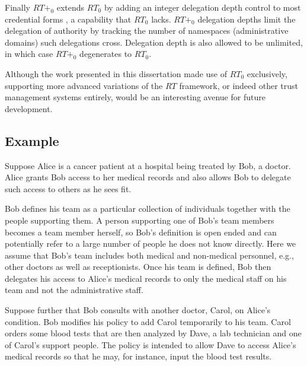 Finally $RT+_0$ extends $RT_0$ by adding an integer delegation depth control to most
credential forms \cite{Hong:DDCTMS}, a capability that $RT_0$ lacks. $RT+_0$ delegation depths
limit the delegation of authority by tracking the number of namespaces (administrative domains)
such delegations cross. Delegation depth is also allowed to be unlimited, in which case $RT+_0$
degenerates to $RT_0$.

Although the work presented in this dissertation made use of $RT_0$ exclusively, supporting more
advanced variations of the $RT$ framework, or indeed other trust management systems entirely,
would be an interesting avenue for future development.

\subsection{Example}

Suppose Alice is a cancer patient at a hospital being treated by Bob, a doctor. Alice grants Bob
access to her medical records and also allows Bob to delegate such access to others as he sees
fit.

Bob defines his team as a particular collection of individuals together with the people
supporting them. A person supporting one of Bob's team members becomes a team member herself, so
Bob's definition is open ended and can potentially refer to a large number of people he does not
know directly. Here we assume that Bob's team includes both medical and non-medical personnel,
e.g., other doctors as well as receptionists. Once his team is defined, Bob then delegates his
access to Alice's medical records to only the medical staff on his team and not the
administrative staff.

Suppose further that Bob consults with another doctor, Carol, on Alice's condition. Bob modifies
his policy to add Carol temporarily to his team. Carol orders some blood tests that are then
analyzed by Dave, a lab technician and one of Carol's support people. The policy is intended to
allow Dave to access Alice's medical records so that he may, for instance, input the blood test
results.

